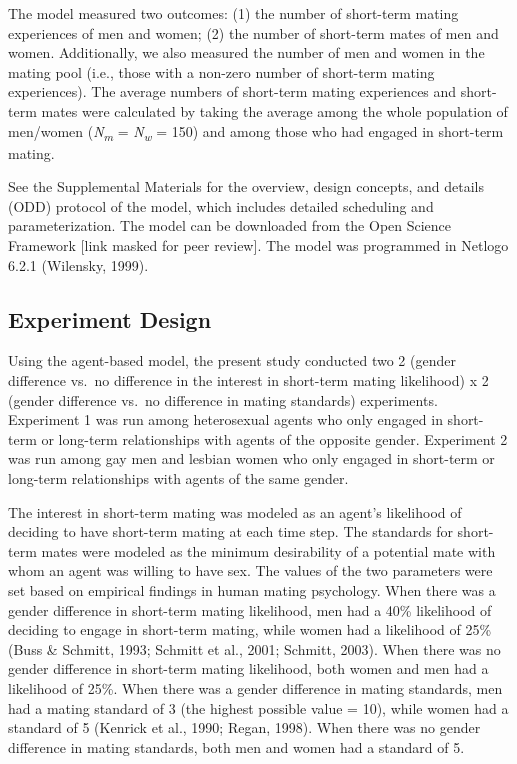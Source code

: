 \documentclass[
  11pt,
]{article}
\begin{document}
The model measured two outcomes: (1) the number of short-term mating
experiences of men and women; (2) the number of short-term mates of men
and women. Additionally, we also measured the number of men and women in
the mating pool (i.e., those with a non-zero number of short-term mating
experiences). The average numbers of short-term mating experiences and
short-term mates were calculated by taking the average among the whole
population of men/women (\emph{N\textsubscript{m}} =
\emph{N\textsubscript{w}} = 150) and among those who had engaged in
short-term mating.

See the Supplemental Materials for the overview, design concepts, and
details (ODD) protocol of the model, which includes detailed scheduling
and parameterization. The model can be downloaded from the Open Science
Framework {[}link masked for peer review{]}. The model was programmed in
Netlogo 6.2.1 (Wilensky, 1999).

\hypertarget{experiment-design}{%
\subsection{Experiment Design}\label{experiment-design}}

Using the agent-based model, the present study conducted two 2 (gender
difference vs.~no difference in the interest in short-term mating
likelihood) x 2 (gender difference vs.~no difference in mating
standards) experiments. Experiment 1 was run among heterosexual agents
who only engaged in short-term or long-term relationships with agents of
the opposite gender. Experiment 2 was run among gay men and lesbian
women who only engaged in short-term or long-term relationships with
agents of the same gender.

The interest in short-term mating was modeled as an agent's likelihood
of deciding to have short-term mating at each time step. The standards
for short-term mates were modeled as the minimum desirability of a
potential mate with whom an agent was willing to have sex. The values of
the two parameters were set based on empirical findings in human mating
psychology. When there was a gender difference in short-term mating
likelihood, men had a 40\% likelihood of deciding to engage in
short-term mating, while women had a likelihood of 25\% (Buss \&
Schmitt, 1993; Schmitt et al., 2001; Schmitt, 2003). When there was no
gender difference in short-term mating likelihood, both women and men
had a likelihood of 25\%. When there was a gender difference in mating
standards, men had a mating standard of 3 (the highest possible value =
10), while women had a standard of 5 (Kenrick et al., 1990; Regan,
1998). When there was no gender difference in mating standards, both men
and women had a standard of 5.
\end{document}
